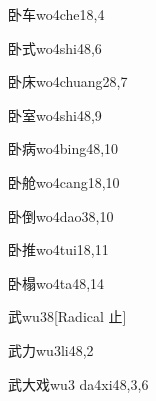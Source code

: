 \begin{verbete}{卧车}{wo4che1}{8,4}
\end{verbete}

\begin{verbete}{卧式}{wo4shi4}{8,6}
\end{verbete}

\begin{verbete}{卧床}{wo4chuang2}{8,7}
\end{verbete}

\begin{verbete}{卧室}{wo4shi4}{8,9}
\end{verbete}

\begin{verbete}{卧病}{wo4bing4}{8,10}
\end{verbete}

\begin{verbete}{卧舱}{wo4cang1}{8,10}
\end{verbete}

\begin{verbete}{卧倒}{wo4dao3}{8,10}
\end{verbete}

\begin{verbete}{卧推}{wo4tui1}{8,11}
\end{verbete}

\begin{verbete}{卧榻}{wo4ta4}{8,14}
\end{verbete}

\begin{verbete}{武}{wu3}{8}[Radical 止]
\end{verbete}

\begin{verbete}{武力}{wu3li4}{8,2}
\end{verbete}

\begin{verbete}{武大戏}{wu3 da4xi4}{8,3,6}
\end{verbete}

